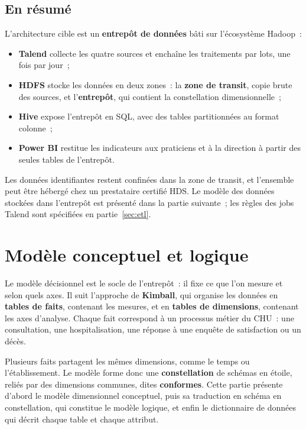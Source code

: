 \subsection*{En résumé}

\noindent L'architecture cible est un \textbf{entrepôt de données} bâti sur l'écosystème Hadoop~:
\begin{itemize}
	\item \textbf{Talend} collecte les quatre sources et enchaîne les traitements par lots, une fois par jour~;
	\item \textbf{HDFS} stocke les données en deux zones~: la \textbf{zone de transit}, copie brute des sources, et l'\textbf{entrepôt}, qui contient la constellation dimensionnelle~;
	\item \textbf{Hive} expose l'entrepôt en SQL, avec des tables partitionnées au format colonne~;
	\item \textbf{Power BI} restitue les indicateurs aux praticiens et à la direction à partir des seules tables de l'entrepôt.
\end{itemize}

\noindent Les données identifiantes restent confinées dans la zone de transit, et l'ensemble peut être hébergé chez un prestataire certifié HDS. Le modèle des données stockées dans l'entrepôt est présenté dans la partie suivante~; les règles des jobs Talend sont spécifiées en partie~\ref{sec:etl}.

\newpage
\section{Modèle conceptuel et logique}\label{sec:modele}

\noindent Le modèle décisionnel est le socle de l'entrepôt~: il fixe ce que l'on mesure et selon quels axes. Il suit l'approche de \textbf{Kimball}, qui organise les données en \textbf{tables de faits}, contenant les mesures, et en \textbf{tables de dimensions}, contenant les axes d'analyse. Chaque fait correspond à un processus métier du CHU~: une consultation, une hospitalisation, une réponse à une enquête de satisfaction ou un décès.

\vspace{0.2cm}

\noindent Plusieurs faits partagent les mêmes dimensions, comme le temps ou l'établissement. Le modèle forme donc une \textbf{constellation} de schémas en étoile, reliés par des dimensions communes, dites \textbf{conformes}. Cette partie présente d'abord le modèle dimensionnel conceptuel, puis sa traduction en schéma en constellation, qui constitue le modèle logique, et enfin le dictionnaire de données qui décrit chaque table et chaque attribut.

